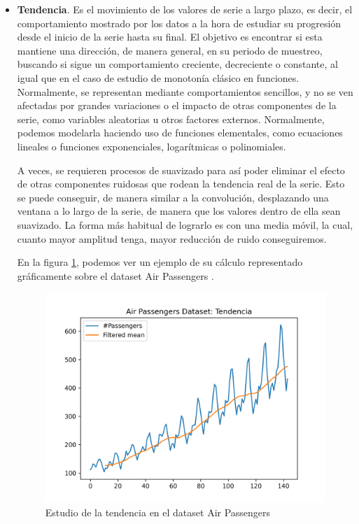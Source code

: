 \begin{itemize}
    \item \textbf{Tendencia}. Es el movimiento de los valores de serie a largo plazo, es decir, el comportamiento mostrado por los datos a la hora de estudiar su progresión desde el inicio de la serie hasta su final. El objetivo es encontrar si esta mantiene una dirección, de manera general, en su periodo de muestreo, buscando si sigue un comportamiento creciente, decreciente o constante, al igual que en el caso de estudio de monotonía clásico en funciones. Normalmente, se representan mediante comportamientos sencillos, y no se ven afectadas por grandes variaciones o el impacto de otras componentes de la serie, como variables aleatorias u otros factores externos. Normalmente, podemos modelarla haciendo uso de funciones elementales, como ecuaciones lineales o funciones exponenciales, logarítmicas o polinomiales.

    A veces, se requieren procesos de suavizado para así poder eliminar el efecto de otras componentes ruidosas que rodean la tendencia real de la serie. Esto se puede conseguir, de manera similar a la convolución, desplazando una ventana a lo largo de la serie, de manera que los valores dentro de ella sean suavizado. La forma más habitual de lograrlo es con una media móvil, la cual, cuanto mayor amplitud tenga, mayor reducción de ruido conseguiremos.

    En la figura \ref{trend}, podemos ver un ejemplo de su cálculo representado gráficamente sobre el dataset Air Passengers \cite{box1976time}.

    \begin{figure}[h] %
        \centering
        \includegraphics[scale=0.6]{img/trend}
        \caption{Estudio de la tendencia en el dataset Air Passengers}
        \label{trend}
    \end{figure}


\end{itemize}
